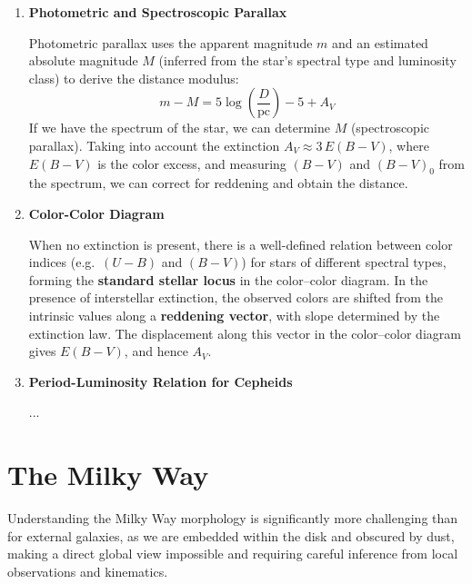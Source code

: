 \begin{enumerate}
Since the total space velocity $V$ is unknown, we eliminate it using $V = V_r/\cos\psi$, then we use the relation $V_t = \mu \cdot d$ (in consistent units):
$$
V_t = V_r \tan\psi \quad \Longrightarrow \quad d = \frac{V_r \tan\psi}{\mu}
$$

\vspace{-0.3em}

The proper motion $\mu$ satisfies $\mu = V_t / d$, so the distance follows directly.

\item \textbf{Photometric and Spectroscopic Parallax}

Photometric parallax uses the apparent magnitude $m$ and an estimated absolute magnitude $M$ (inferred from the star's spectral type and luminosity class) to derive the distance modulus:
$$
m - M = 5 \log\left(\frac{D}{\mathrm{pc}}\right) - 5 + A_V
$$
If we have the spectrum of the star, we can determine $M$ (spectroscopic parallax). Taking into account the extinction $A_V \approx 3\,E(B-V)$, where $E(B-V)$ is the color excess, and measuring $(B-V)$ and $(B-V)_0$ from the spectrum, we can correct for reddening and obtain the distance.

\item \textbf{Color-Color Diagram}

When no extinction is present, there is a well-defined relation between color indices (e.g.\ $(U-B)$ and $(B-V)$) for stars of different spectral types, forming the \textbf{standard stellar locus} in the color--color diagram. In the presence of interstellar extinction, the observed colors are shifted from the intrinsic values along a \textbf{reddening vector}, with slope determined by the extinction law. The displacement along this vector in the color--color diagram gives $E(B-V)$, and hence $A_V$.

\item \textbf{Period-Luminosity Relation for Cepheids}

...
\end{enumerate}

\section{The Milky Way}

Understanding the Milky Way morphology is significantly more challenging than for external galaxies, as we are embedded within the disk and obscured by dust, making a direct global view impossible and requiring careful inference from local observations and kinematics.

